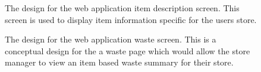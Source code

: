 \documentclass[a4paper,11pt]{report}
\begin{document}
\begin{appendix}
\begin{figure}[H]
            \caption{The design for the web application item description screen. This screen is used to display item information specific for the users store.}
            \label{fig:mobileUIpt2}
        \end{figure}
        \begin{figure}[H]
            \centering
            \caption{The design for the web application waste screen. This is a conceptual design for the a waste page which would allow the store manager to view an item based waste summary for their store.}
            \label{fig:mobileUIpt2}
        \end{figure}
        \begin{figure}[H]
            \centering

\end{figure}
\end{appendix}
\end{document}
